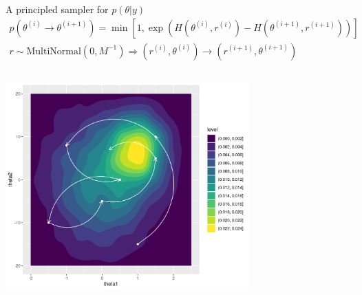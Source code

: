 \documentclass[bigger]{beamer}
\begin{document}
\begin{frame}[label={sec:org74d3318}]{A principled sampler for \(p(\theta|y)\)}
\begin{align*}
  p(\theta^{(i)} \rightarrow \theta^{(i+1)}) =\min\left[
    1, \exp{(H(\theta^{(i)}, r^{(i)}) - H(\theta^{(i+1)}, r^{(i+1)}))}
  \right]\\
  r \sim \text{MultiNormal}(0, M^{-1}) \Longrightarrow
  (r^{(i)}, \theta^{(i)}) \rightarrow (r^{(i+1)}, \theta^{(i+1)})
\end{align*}
\begin{columns}
\begin{column}{0.7\columnwidth}
\begin{center}
\includegraphics[width=0.7\textwidth]{./figure/sampler_path.png}
\end{center}
\end{column}


\end{columns}
\end{frame}
\end{document}
